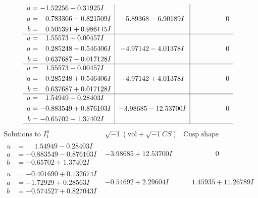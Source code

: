 \documentclass[1p]{elsarticle_modified}
\theoremstyle{definition}
\newcommand{\I}{\sqrt{-1}}
\begin{document}
$$\begin{array}{c|c|c}
\begin{aligned}
u &= -1.52256 - 0.31925 I \\
a &= \phantom{-}0.783366 - 0.821509 I \\
b &= \phantom{-}0.505391 + 0.986115 I\end{aligned}
 & -5.89368 - 6.90189 I & \phantom{-0.000000 } 0 \\ \hline\begin{aligned}
u &= \phantom{-}1.55573 + 0.00457 I \\
a &= \phantom{-}0.285248 - 0.546406 I \\
b &= \phantom{-}0.637687 - 0.017128 I\end{aligned}
 & -4.97142 - 4.01378 I & \phantom{-0.000000 } 0 \\ \hline\begin{aligned}
u &= \phantom{-}1.55573 - 0.00457 I \\
a &= \phantom{-}0.285248 + 0.546406 I \\
b &= \phantom{-}0.637687 + 0.017128 I\end{aligned}
 & -4.97142 + 4.01378 I & \phantom{-0.000000 } 0 \\ \hline\begin{aligned}
u &= \phantom{-}1.54949 + 0.28403 I \\
a &= -0.883549 + 0.876103 I \\
b &= -0.65702 - 1.37402 I\end{aligned}
 & -3.98685 - 12.53700 I & \phantom{-0.000000 } 0\\
 \hline 
 \end{array}$$\newpage$$\begin{array}{c|c|c}  
\text{Solutions to }I^u_{1}& \I (\text{vol} + \sqrt{-1}CS) & \text{Cusp shape}\\
 \hline 
\begin{aligned}
u &= \phantom{-}1.54949 - 0.28403 I \\
a &= -0.883549 - 0.876103 I \\
b &= -0.65702 + 1.37402 I\end{aligned}
 & -3.98685 + 12.53700 I & \phantom{-0.000000 } 0 \\ \hline\begin{aligned}
u &= -0.401690 + 0.132674 I \\
a &= -1.72929 + 0.28563 I \\
b &= -0.574527 + 0.827043 I\end{aligned}
 & -0.54692 + 2.29604 I & \phantom{-}1.45935 + 11.26789 I \\ \hline\begin{aligned}

\end{aligned}
\end{array}$$
\end{document}

